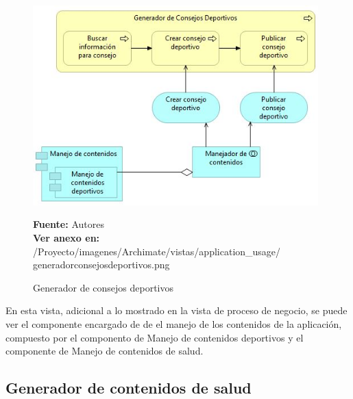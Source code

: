 \begin{figure}[!htb]
  \begin{center}
    \includegraphics[width=11cm]{./imagenes/Archimate/vistas/application_usage/generadorconsejosdeportivos.png}
    \caption{Generador de consejos deportivos}
    \label{fig:BP_GeneradorConsejosDeportivos}
    \textbf{Fuente:}  Autores \\
    \textbf{Ver anexo en:} /Proyecto/imagenes/Archimate/vistas/application\_usage/
    generadorconsejosdeportivos.png
  \end{center}
\end{figure}

En esta vista, adicional a lo mostrado en la vista de proceso de negocio, se puede ver el componente encargado de de el manejo de los contenidos de la aplicación, compuesto por el componento de Manejo de contenidos deportivos y el componente de Manejo de contenidos de salud.

\subsection{Generador de contenidos de salud}

